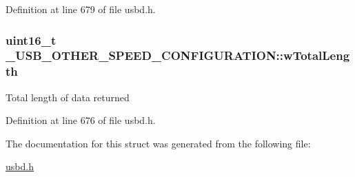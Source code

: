 Definition at line 679 of file usbd.\+h.

\subsubsection[{\texorpdfstring{w\+Total\+Length}{wTotalLength}}]{\setlength{\rightskip}{0pt plus 5cm}uint16\+\_\+t \+\_\+\+U\+S\+B\+\_\+\+O\+T\+H\+E\+R\+\_\+\+S\+P\+E\+E\+D\+\_\+\+C\+O\+N\+F\+I\+G\+U\+R\+A\+T\+I\+O\+N\+::w\+Total\+Length}\hypertarget{struct__USB__OTHER__SPEED__CONFIGURATION_af624dbc10570cb8fbca7323c6bffcb70}{}\label{struct__USB__OTHER__SPEED__CONFIGURATION_af624dbc10570cb8fbca7323c6bffcb70}
Total length of data returned 

Definition at line 676 of file usbd.\+h.



The documentation for this struct was generated from the following file\+:\begin{DoxyCompactItemize}
\item 
\hyperlink{usbd_8h}{usbd.\+h}\end{DoxyCompactItemize}
